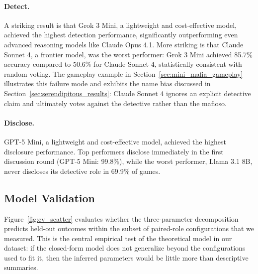 \documentclass{article}
\begin{document}
\paragraph{Detect.} A striking result is that Grok 3 Mini, a lightweight and cost-effective model, achieved the highest detection performance, significantly outperforming even advanced reasoning models like Claude Opus 4.1. More striking is that Claude Sonnet 4, a frontier model, was the worst performer: Grok 3 Mini achieved 85.7\% accuracy compared to 50.6\% for Claude Sonnet 4, statistically consistent with random voting. The gameplay example in Section~\ref{sec:mini_mafia_gameplay} illustrates this failure mode and exhibits the name bias discussed in Section~\ref{sec:serendipitous_results}: Claude Sonnet 4 ignores an explicit detective claim and ultimately votes against the detective rather than the mafioso.

\paragraph{Disclose.} GPT-5 Mini, a lightweight and cost-effective model, achieved the highest disclosure performance. Top performers disclose immediately in the first discussion round (GPT-5 Mini: 99.8\%), while the worst performer, Llama 3.1 8B, never discloses its detective role in 69.9\% of games.



\subsection{Model Validation}
\label{sec:model_validation}

Figure~\ref{fig:cv_scatter} evaluates whether the three-parameter decomposition predicts held-out outcomes within the subset of paired-role configurations that we measured. This is the central empirical test of the theoretical model in our dataset: if the closed-form model does not generalize beyond the configurations used to fit it, then the inferred parameters would be little more than descriptive summaries.
\end{document}
